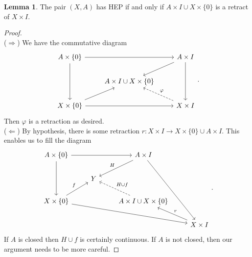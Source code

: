 \documentclass[10pt,letterpaper,cm]{nupset}
\theoremstyle{definition}
\theoremstyle{theorem}
\newtheorem{lemma}[definition]{Lemma}
\theoremstyle{remark}
\newcommand{\1}{\mathbb{1}}
\newcommand{\0}{\vec 0}
\begin{document}
\begin{lemma}
The pair $(X, A)$ has HEP if and only if $A\times I \cup X \times \{0\}$ is a retract of $X\times I$.
\end{lemma}
\begin{proof} $ $
\\
($\Longrightarrow$) We have the commutative diagram
\[
\begin{tikzcd}
A\times \{0\} \arrow[dd] \arrow[rr] &  & A\times I \arrow[ld] \arrow[dd] \\
 & A\times I \cup X \times \{0\} &  \\
X\times \{0\} \arrow[ru] \arrow[rr] &  & X\times I \arrow[lu, "\varphi"', dashed]
\end{tikzcd}
.\] Then $\varphi$ is a retraction as desired. 
\\
($\Longleftarrow$) By hypothesis, there is some retraction $r: X\times I \to X\times \{0\} \cup A \times I$. This enables us to fill the diagram
\[
\begin{tikzcd}
A\times \{0\} \arrow[dd] \arrow[rr] &  & A\times I \arrow[ld, "H"'] \arrow[rddd] &  \\
 & Y &  &  \\
X\times \{0\} \arrow[ru, "f"] \arrow[rrrd] &  & A\times I \cup X \times \{0\} \arrow[lu, "H \cup f"', dashed] &  \\
 &  &  & X\times I \arrow[lu, "r"']
\end{tikzcd}
.\] If $A$ is closed then $H\cup f$ is certainly continuous. If $A$ is not closed, then our argument needs to be more careful. 
\end{proof}
\end{document}
